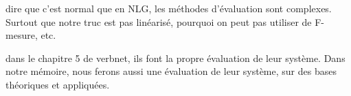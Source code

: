 dire que c'est normal que en NLG, les méthodes d'évaluation sont complexes. Surtout que notre truc est pas linéarisé, pourquoi on peut pas utiliser de F-mesure, etc.

dans le chapitre 5 de verbnet, ils font la propre évaluation de leur système. Dans notre mémoire, nous ferons aussi une évaluation de leur système, sur des bases théoriques et appliquées.
